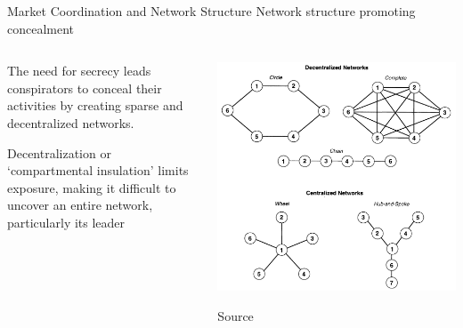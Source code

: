 \documentclass[notes, aspectratio=1610]{beamer}
\begin{document}
\begin{frame}{Market Coordination and Network Structure}
	{Network structure promoting concealment}

	\small

	\begin{columns}
			\begin{column}{0.5\textwidth}

		\begin{tcolorbox}[
			colback=base_c!5!white,
			colframe=base_c!90!black,
			title={\centering Proposition 1}]
			The need for secrecy leads conspirators to conceal their 
			activities by creating sparse and decentralized networks.
		\end{tcolorbox}

		\begin{tcolorbox}[
			colback=comp_c!5!white,
			colframe=comp_c!90!black,
			title={\centering Argument for Proposition 1}]
			Decentralization or `compartmental insulation'
			limits exposure, making it difficult to uncover an entire 
			network, particularly its leader
		\end{tcolorbox}

		\end{column}

		\begin{column}{0.5\textwidth}
			\includegraphics[width=1\textwidth]{images/centralization}

			\raggedleft Source~\cite[][page 849]{baker_faulkner_1993}
		\end{column}

	\end{columns}
\end{frame}
\end{document}
